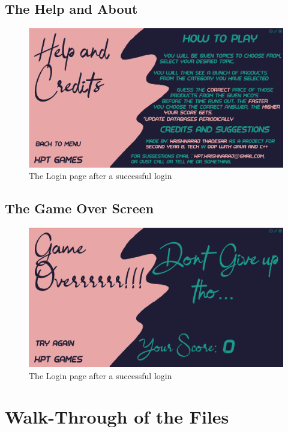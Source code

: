 \documentclass[11pt]{article}
\begin{document}
\subsection{The Help and About}
\begin{figure}[H]
	\centering
	\includegraphics[scale=0.30]{./design/Screenshots/Help and Credits.png}
	\caption{The Login page after a successful login}
\end{figure}
\subsection{The Game Over Screen}
\begin{figure}[H]
	\centering
	\includegraphics[scale=0.30]{./design/Screenshots/Game Over.png}
	\caption{The Login page after a successful login}
\end{figure}

\section{Walk-Through of the Files}
\end{document}
